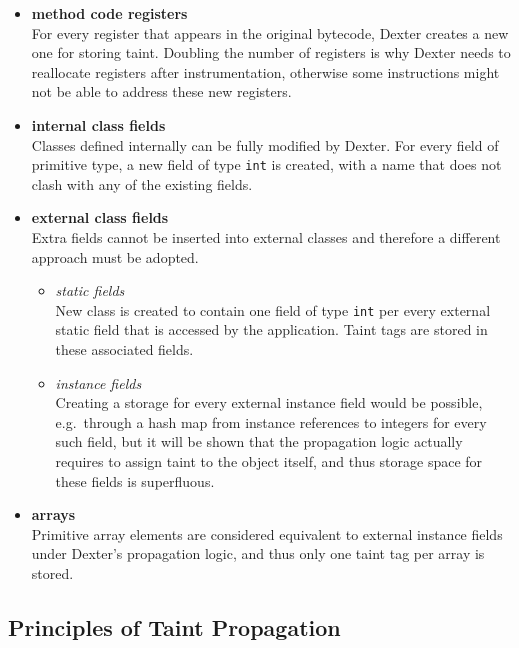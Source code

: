 \documentclass[12pt,twoside,notitlepage]{report}
\begin{document}
\begin{itemize}

\item \textbf{method code registers} \\
For every register that appears in the original bytecode, Dexter creates a new one for storing taint. Doubling the number of registers is why Dexter needs to reallocate registers after instrumentation, otherwise some instructions might not be able to address these new registers.

\item \textbf{internal class fields} \\
Classes defined internally can be fully modified by Dexter. For every field of primitive type, a new field of type \verb$int$ is created, with a name that does not clash with any of the existing fields.

\item \textbf{external class fields} \\
Extra fields cannot be inserted into external classes and therefore a different approach must be adopted. 
\begin{itemize}
\item \textit{static fields} \\
New class is created to contain one field of type \verb$int$ per every external static field that is accessed by the application. Taint tags are stored in these associated fields.

\item \textit{instance fields} \\
Creating a storage for every external instance field would be possible, e.g.\ through a hash map from instance references to integers for every such field, but it will be shown that the propagation logic actually requires to assign taint to the object itself, and thus storage space for these fields is superfluous.

\end{itemize}

\item \textbf{arrays} \\
Primitive array elements are considered equivalent to external instance fields under Dexter's propagation logic, and thus only one taint tag per array is stored.

\end{itemize}


\subsection{Principles of Taint Propagation}
\end{document}
